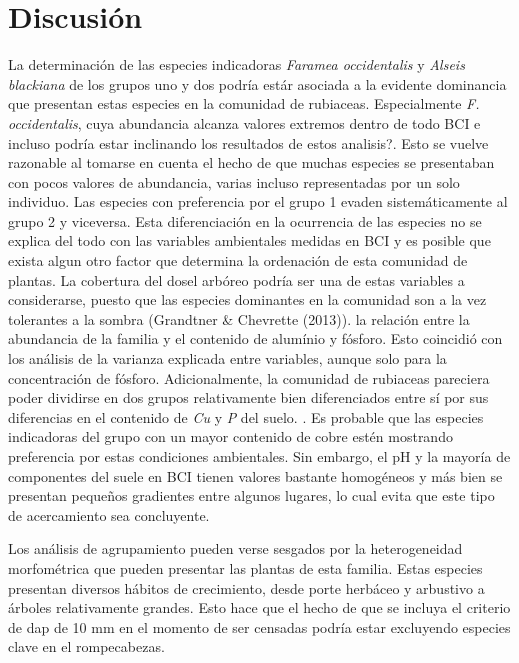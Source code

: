 \documentclass[11pt,]{article}
\begin{document}
\section{Discusión}\label{discusiuxf3n}

La determinación de las especies indicadoras \emph{Faramea occidentalis}
y \emph{Alseis blackiana} de los grupos uno y dos podría estár asociada
a la evidente dominancia que presentan estas especies en la comunidad de
rubiaceas. Especialmente \emph{F. occidentalis}, cuya abundancia alcanza
valores extremos dentro de todo BCI e incluso podría estar inclinando
los resultados de estos analisis?. Esto se vuelve razonable al tomarse
en cuenta el hecho de que muchas especies se presentaban con pocos
valores de abundancia, varias incluso representadas por un solo
individuo. Las especies con preferencia por el grupo 1 evaden
sistemáticamente al grupo 2 y viceversa. Esta diferenciación en la
ocurrencia de las especies no se explica del todo con las variables
ambientales medidas en BCI y es posible que exista algun otro factor que
determina la ordenación de esta comunidad de plantas. La cobertura del
dosel arbóreo podría ser una de estas variables a considerarse, puesto
que las especies dominantes en la comunidad son a la vez tolerantes a la
sombra (Grandtner \& Chevrette (2013)). la relación entre la abundancia
de la familia y el contenido de alumínio y fósforo. Esto coincidió con
los análisis de la varianza explicada entre variables, aunque solo para
la concentración de fósforo. Adicionalmente, la comunidad de rubiaceas
pareciera poder dividirse en dos grupos relativamente bien diferenciados
entre sí por sus diferencias en el contenido de \emph{Cu} y \emph{P} del
suelo. . Es probable que las especies indicadoras del grupo con un mayor
contenido de cobre estén mostrando preferencia por estas condiciones
ambientales. Sin embargo, el pH y la mayoría de componentes del suele en
BCI tienen valores bastante homogéneos y más bien se presentan pequeños
gradientes entre algunos lugares, lo cual evita que este tipo de
acercamiento sea concluyente.

Los análisis de agrupamiento pueden verse sesgados por la heterogeneidad
morfométrica que pueden presentar las plantas de esta familia. Estas
especies presentan diversos hábitos de crecimiento, desde porte herbáceo
y arbustivo a árboles relativamente grandes. Esto hace que el hecho de
que se incluya el criterio de dap de 10 mm en el momento de ser censadas
podría estar excluyendo especies clave en el rompecabezas.
\end{document}
